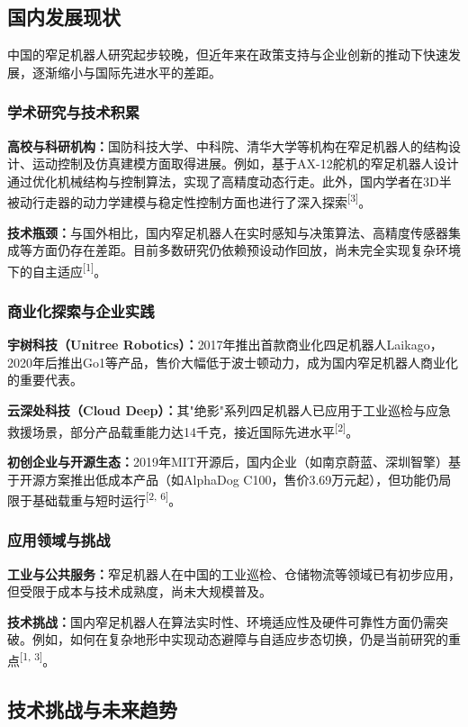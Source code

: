 \documentclass[a4paper,fontset=windows]{ctexart}
\begin{document}
\subsection{国内发展现状}
中国的窄足机器人研究起步较晚，但近年来在政策支持与企业创新的推动下快速发展，逐渐缩小与国际先进水平的差距。

\subsubsection{学术研究与技术积累}
\textbf{高校与科研机构：}国防科技大学、中科院、清华大学等机构在窄足机器人的结构设计、运动控制及仿真建模方面取得进展。例如，基于AX-12舵机的窄足机器人设计通过优化机械结构与控制算法，实现了高精度动态行走。此外，国内学者在3D半被动行走器的动力学建模与稳定性控制方面也进行了深入探索\textsuperscript{[3]}。

\textbf{技术瓶颈：}与国外相比，国内窄足机器人在实时感知与决策算法、高精度传感器集成等方面仍存在差距。目前多数研究仍依赖预设动作回放，尚未完全实现复杂环境下的自主适应\textsuperscript{[1]}。

\subsubsection{商业化探索与企业实践}
\textbf{宇树科技（Unitree Robotics）：}2017年推出首款商业化四足机器人Laikago，2020年后推出Go1等产品，售价大幅低于波士顿动力，成为国内窄足机器人商业化的重要代表。

\textbf{云深处科技（Cloud Deep）：}其"绝影"系列四足机器人已应用于工业巡检与应急救援场景，部分产品载重能力达14千克，接近国际先进水平\textsuperscript{[2]}。

\textbf{初创企业与开源生态：}2019年MIT开源后，国内企业（如南京蔚蓝、深圳智擎）基于开源方案推出低成本产品（如AlphaDog C100，售价3.69万元起），但功能仍局限于基础载重与短时运行\textsuperscript{[2, 6]}。

\subsubsection{应用领域与挑战}
\textbf{工业与公共服务：}窄足机器人在中国的工业巡检、仓储物流等领域已有初步应用，但受限于成本与技术成熟度，尚未大规模普及。

\textbf{技术挑战：}国内窄足机器人在算法实时性、环境适应性及硬件可靠性方面仍需突破。例如，如何在复杂地形中实现动态避障与自适应步态切换，仍是当前研究的重点\textsuperscript{[1, 3]}。

\subsection{技术挑战与未来趋势}
\end{document}
